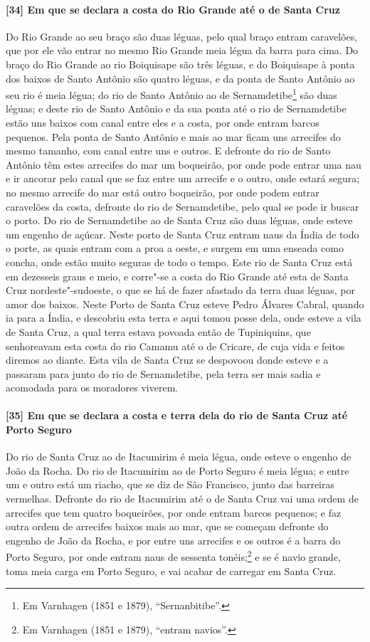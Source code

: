 \paragraph{[34] Em que se declara a costa do Rio Grande até o de Santa Cruz} \quad
Do Rio Grande ao seu braço são duas léguas, pelo qual braço entram caravelões, que por ele
vão entrar no mesmo Rio Grande meia légua da barra para cima. Do braço do Rio Grande ao
rio Boiquisape são três léguas, e do Boiquisape à ponta dos baixos de Santo Antônio são
quatro léguas, e da ponta de Santo Antônio ao seu rio é meia légua; do rio de Santo
Antônio ao de Sernamdetibe\footnote{ Em Varnhagen (1851 e 1879), ``Sernanbitibe''.} são
duas léguas; e deste rio de Santo Antônio e da sua ponta até o rio de Sernamdetibe estão
uns baixos com canal entre eles e a costa, por onde entram barcos pequenos. Pela ponta de
Santo Antônio e mais ao mar ficam uns arrecifes do mesmo tamanho, com canal entre uns e
outros. E defronte do rio de Santo Antônio têm estes arrecifes do mar um boqueirão, por
onde pode entrar uma nau e ir ancorar pelo canal que se faz entre um arrecife e o outro,
onde estará segura; no mesmo arrecife do mar está outro boqueirão, por onde podem entrar
caravelões da costa, defronte do rio de Sernamdetibe, pelo qual se pode ir buscar o porto.
Do rio de Sernamdetibe ao de Santa Cruz são duas léguas, onde esteve um engenho de açúcar.
Neste porto de Santa Cruz entram naus da Índia de todo o porte, as quais entram com a proa
a oeste, e surgem em uma enseada como concha, onde estão muito seguras de todo o tempo.
Este rio de Santa Cruz está em dezesseis graus e meio, e corre"-se a costa do Rio Grande
até esta de Santa Cruz nordeste"-sudoeste, o que se há de fazer afastado da terra duas
léguas, por amor dos baixos. Neste Porto de Santa Cruz esteve Pedro Álvares Cabral, quando
ia para a Índia, e descobriu esta terra e aqui tomou posse dela, onde esteve a vila de
Santa Cruz, a qual terra estava povoada então de Tupiniquins, que senhoreavam esta costa
do rio Camamu até o de Cricare, de cuja vida e feitos diremos ao diante. Esta vila de
Santa Cruz se despovoou donde esteve e a passaram para junto do rio de Sernamdetibe, pela
terra ser mais sadia e acomodada para os moradores viverem.

\paragraph{[35] Em que se declara a costa e terra dela do rio de Santa Cruz até Porto
Seguro} \quad
Do rio de Santa Cruz ao de Itacumirim é meia légua, onde esteve o engenho de João da
Rocha. Do rio de Itacumirim ao de Porto Seguro é meia légua; e entre um e outro está um
riacho, que se diz de São Francisco, junto das barreiras vermelhas. Defronte do rio de
Itacumirim até o de Santa Cruz vai uma ordem de arrecifes que tem quatro boqueirões, por
onde entram barcos pequenos; e faz outra ordem de arrecifes baixos mais ao mar, que se
começam defronte do engenho de João da Rocha, e por entre uns arrecifes e os outros é a
barra do Porto Seguro, por onde entram naus de sessenta tonéis;\footnote{ Em Varnhagen
(1851 e 1879), ``entram navios''.} e se é navio grande, toma meia carga em Porto Seguro, e
vai acabar de carregar em Santa Cruz.

